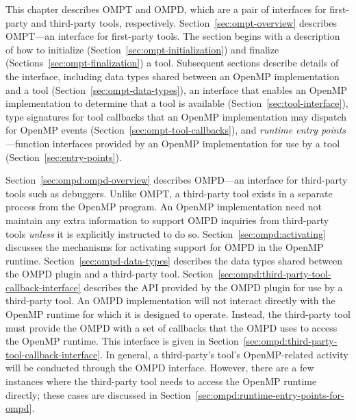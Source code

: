 This chapter describes OMPT and OMPD, which are a pair of interfaces for first-party and third-party
tools, respectively.  Section~\ref{sec:ompt-overview} describes OMPT---an interface for first-party tools.
The section begins with a description of how to initialize (Section~\ref{sec:ompt-initialization})
and finalize (Sections~\ref{sec:ompt-finalization}) a tool.
Subsequent sections describe details of the interface, including
data types shared between an OpenMP implementation and a tool
(Section~\ref{sec:ompt-data-types}), 
an interface that enables an OpenMP implementation to determine that a
tool is available (Section~\ref{sec:tool-interface}),
type signatures for tool callbacks 
that an OpenMP implementation may dispatch for OpenMP events
(Section~\ref{sec:ompt-tool-callbacks}), and 
\emph{runtime entry points}---function interfaces
provided by an OpenMP implementation for use by a tool
(Section~\ref{sec:entry-points}). 

Section~\ref{sec:ompd:ompd-overview} describes
OMPD---an interface for  third-party tools such as debuggers. 
Unlike OMPT, a third-party tool exists in a separate process from 
the OpenMP program.
An OpenMP implementation need not maintain any extra information to support OMPD inquiries from third-party tools
\emph{unless} it is explicitly instructed to do so.
Section~\ref{sec:ompd:activating} discusses the mechanisms for
activating support for OMPD in the OpenMP runtime.
Section~\ref{sec:ompd-data-types}  describes the data types shared between the OMPD plugin and a third-party tool.
Section~\ref{sec:ompd:third-party-tool-callback-interface} describes the API provided by the OMPD plugin for use by a third-party tool. 
An OMPD implementation will not interact directly with the OpenMP
runtime for which it is designed to operate.
Instead, the third-party tool must provide the OMPD with a set of
callbacks that the OMPD uses to access the OpenMP runtime.
This interface is given in
Section~\ref{sec:ompd:third-party-tool-callback-interface}.
In general, a third-party's tool's OpenMP-related activity will be
conducted through the OMPD interface.
However, there are a few instances where the third-party tool needs
to access the OpenMP runtime directly;
these cases are discussed in
Section~\ref{sec:ompd:runtime-entry-points-for-ompd}.








